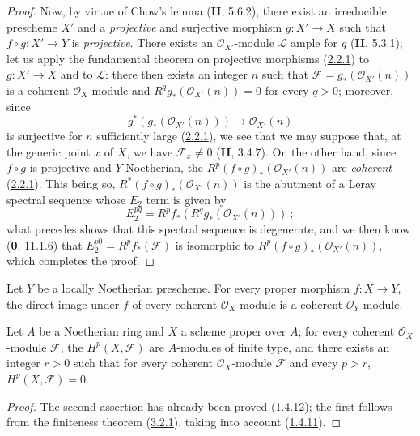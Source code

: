 \begin{proof}
Now, by virtue of Chow's lemma (\textbf{II}, 5.6.2), there exist an irreducible
prescheme $X'$ and a \emph{projective} and surjective morphism
$g:X'\to X$ such that $f\circ g:X'\to Y$ is \emph{projective}. There exists an
$\mathcal O_{X'}$-module $\mathcal L$ ample for $g$ (\textbf{II}, 5.3.1);
let us apply the fundamental theorem on projective morphisms
(\hyperref[III.2.2.1]{2.2.1}) to $g:X'\to X$ and to $\mathcal L$: there
then exists an integer $n$ such that
$\mathcal F=g_*(\mathcal O_{X'}(n))$ is a coherent $\mathcal O_X$-module
and $R^qg_*(\mathcal O_{X'}(n))=0$ for every $q>0$; moreover, since
\[
g^*(g_*(\mathcal O_{X'}(n)))\longrightarrow\mathcal O_{X'}(n)
\]
is surjective for $n$ sufficiently large (\hyperref[III.2.2.1]{2.2.1}), we
see that we may suppose that, at the generic point $x$ of $X$, we have
$\mathcal F_x\neq0$ (\textbf{II}, 3.4.7). On the other hand, since $f\circ g$ is
projective and $Y$ Noetherian, the
$R^p(f\circ g)_*(\mathcal O_{X'}(n))$ are \emph{coherent}
(\hyperref[III.2.2.1]{2.2.1}). This being so,
$R^*(f\circ g)_*(\mathcal O_{X'}(n))$ is the abutment of a Leray spectral
sequence whose $E_2$ term is given by
\[
E_2^{pq}=R^pf_*(R^qg_*(\mathcal O_{X'}(n)))~;
\]
what precedes shows that this spectral sequence is degenerate, and we then
know (\textbf{0}, 11.1.6) that $E_2^{p0}=R^pf_*(\mathcal F)$ is isomorphic to
$R^p(f\circ g)_*(\mathcal O_{X'}(n))$, which completes the proof.
\end{proof}

\begin{corollary}[3.2.2]
\label{III.3.2.2}
Let $Y$ be a locally Noetherian prescheme. For every proper morphism
$f:X\to Y$, the direct image under $f$ of every coherent $\mathcal O_X$-module
is a coherent $\mathcal O_Y$-module.
\end{corollary}

\begin{corollary}[3.2.3]
\label{III.3.2.3}
Let $A$ be a Noetherian ring and $X$ a scheme proper over $A$; for every
coherent $\mathcal O_X$-module $\mathcal F$, the $H^p(X,\mathcal F)$ are
$A$-modules of finite type, and there exists an integer $r>0$ such that for every
coherent $\mathcal O_X$-module $\mathcal F$ and every $p>r$,
$H^p(X,\mathcal F)=0$.
\end{corollary}

\begin{proof}
The second assertion has already been proved
(\hyperref[III.1.4.12]{1.4.12}); the first follows from the finiteness
theorem (\hyperref[III.3.2.1]{3.2.1}), taking into account
(\hyperref[III.1.4.11]{1.4.11}).
\end{proof}

